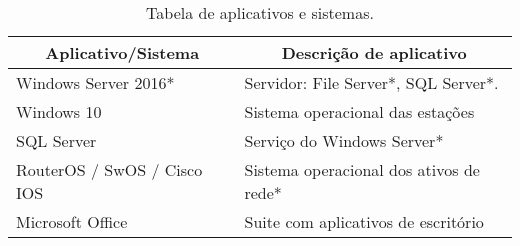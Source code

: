 \begin{table}[h!]
	\centering
\caption{Tabela de aplicativos e sistemas.}
\label{tab3}
	\renewcommand{\arraystretch}{1.4}
	\begin{tabular}{|l|l|}
		\hline
		\multicolumn{1}{|c|}{\textbf{Aplicativo/Sistema}} &	 \multicolumn{1}{|c|}{\textbf{Descrição  de aplicativo}}                                 		  \\ \hline
		Windows Server 2016*                               
		& Servidor: File Server*, SQL Server*.                                               \\ \hline
		Windows 10                             
		& Sistema operacional das estações           					\\ \hline
		SQL Server                                  
		& Serviço do Windows Server*         \\ \hline
		RouterOS / SwOS / Cisco IOS
		& Sistema operacional dos ativos de rede*        \\ \hline
		Microsoft Office                                  
		& Suite com aplicativos de escritório   \\ \hline
	\end{tabular}
\end{table}

